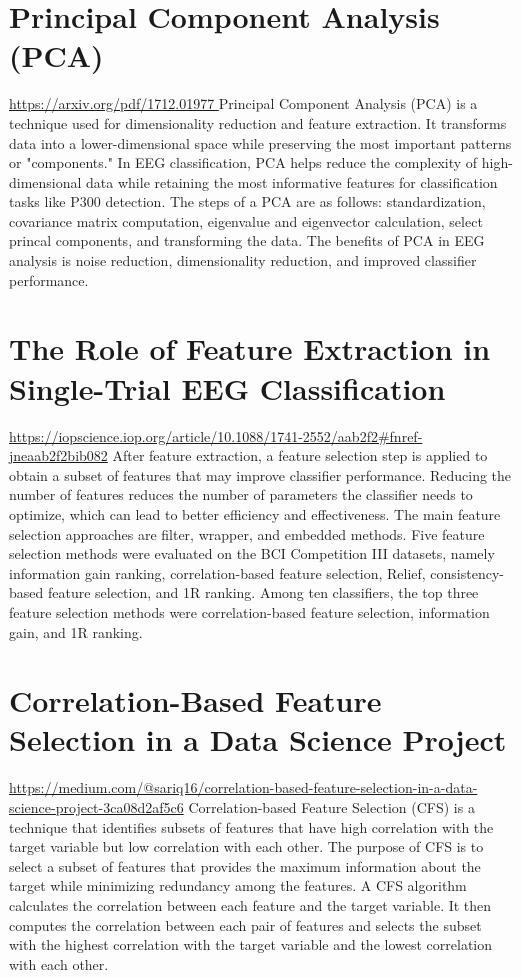 \documentclass[12pt]{article}
\begin{document}
\section{Principal Component Analysis (PCA)}
\url{https://arxiv.org/pdf/1712.01977 }
Principal Component Analysis (PCA) is a technique used for dimensionality reduction and feature extraction. It transforms data into a lower-dimensional space while preserving the most important patterns or "components." In EEG classification, PCA helps reduce the complexity of high-dimensional data while retaining the most informative features for classification tasks like P300 detection. The steps of a PCA are as follows: standardization, covariance matrix computation, eigenvalue and eigenvector calculation, select princal components, and transforming the data. The benefits of PCA in EEG analysis is noise reduction, dimensionality reduction, and improved classifier performance.

\section{The Role of Feature Extraction in Single-Trial EEG Classification}
\url{https://iopscience.iop.org/article/10.1088/1741-2552/aab2f2\#fnref-jneaab2f2bib082}
After feature extraction, a feature selection step is applied to obtain a subset of features that may improve classifier performance. Reducing the number of features reduces the number of parameters the classifier needs to optimize, which can lead to better efficiency and effectiveness. The main feature selection approaches are filter, wrapper, and embedded methods. Five feature selection methods were evaluated on the BCI Competition III datasets, namely information gain ranking, correlation-based feature selection, Relief, consistency-based feature selection, and 1R ranking. Among ten classifiers, the top three feature selection methods were correlation-based feature selection, information gain, and 1R ranking.

\section{Correlation-Based Feature Selection in a Data Science Project}
\url{https://medium.com/@sariq16/correlation-based-feature-selection-in-a-data-science-project-3ca08d2af5c6}
Correlation-based Feature Selection (CFS) is a technique that identifies subsets of features that have high correlation with the target variable but low correlation with each other. The purpose of CFS is to select a subset of features that provides the maximum information about the target while minimizing redundancy among the features. A CFS algorithm calculates the correlation between each feature and the target variable. It then computes the correlation between each pair of features and selects the subset with the highest correlation with the target variable and the lowest correlation with each other.
\end{document}
